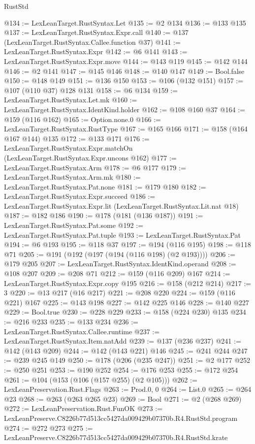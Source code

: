 \begin{lexlean}{RustStd}
\begin{coremodule}
@134 := LexLeanTarget.RustSyntax.Let
@135 := @2 @134
@136 := @133 @135
@137 := LexLeanTarget.RustSyntax.Expr.call
@140 := @137 (LexLeanTarget.RustSyntax.Callee.function @37)
@141 := LexLeanTarget.RustSyntax.Expr
@142 := @6 @141
@143 := LexLeanTarget.RustSyntax.Expr.move
@144 := @143 @119
@145 := @142 @144
@146 := @2 @141
@147 := @145 @146
@148 := @140 @147
@149 := Bool.false
@150 := @148 @149
@151 := @136 @150
@153 := @106 (@132 @151)
@157 := @107 (@110 @37) @128 @131
@158 := @6 @134
@159 := LexLeanTarget.RustSyntax.Let.mk
@160 := LexLeanTarget.RustSyntax.IdentKind.holder
@162 := @108 @160 @37
@164 := @159 (@116 @162)
@165 := Option.none.{0}
@166 := LexLeanTarget.RustSyntax.RustType
@167 := @165 @166
@171 := @158 (@164 @167 @144) @135
@172 := @133 @171
@176 := LexLeanTarget.RustSyntax.Expr.matchOn (LexLeanTarget.RustSyntax.Expr.uncons @162)
@177 := LexLeanTarget.RustSyntax.Arm
@178 := @6 @177
@179 := LexLeanTarget.RustSyntax.Arm.mk
@180 := LexLeanTarget.RustSyntax.Pat.none
@181 := @179 @180
@182 := LexLeanTarget.RustSyntax.Expr.succeed
@186 := LexLeanTarget.RustSyntax.Expr.lit (LexLeanTarget.RustSyntax.Lit.nat @18)
@187 := @182 @186
@190 := @178 (@181 (@136 @187))
@191 := LexLeanTarget.RustSyntax.Pat.some
@192 := LexLeanTarget.RustSyntax.Pat.tuple
@193 := LexLeanTarget.RustSyntax.Pat
@194 := @6 @193
@195 := @118 @37
@197 := @194 (@116 @195)
@198 := @118 @71
@205 := @191 (@192 (@197 (@194 (@116 @198) (@2 @193))))
@206 := @179 @205
@207 := LexLeanTarget.RustSyntax.IdentKind.operand
@208 := @108 @207
@209 := @208 @71
@212 := @159 (@116 @209) @167
@214 := LexLeanTarget.RustSyntax.Expr.copy @195
@216 := @158 (@212 @214)
@217 := 3
@220 := @13 @217 (@16 @217)
@221 := @208 @220
@224 := @159 (@116 @221) @167
@225 := @143 @198
@227 := @142 @225 @146
@228 := @140 @227
@229 := Bool.true
@230 := @228 @229
@233 := @158 (@224 @230) @135
@234 := @216 @233
@235 := @133 @234
@236 := LexLeanTarget.RustSyntax.Callee.runtime
@237 := LexLeanTarget.RustSyntax.Item.natAdd
@239 := @137 (@236 @237)
@241 := @142 (@143 @209)
@244 := @142 (@143 @221) @146
@245 := @241 @244
@247 := @239 @245 @149
@250 := @178 (@206 (@235 @247))
@251 := @2 @177
@252 := @250 @251
@253 := @190 @252
@254 := @176 @253
@255 := @172 @254
@261 := @104 (@153 (@106 (@157 @255) (@2 @105)))
@262 := LexLeanPreservation.Rust.Flags
@263 := Prod.{0, 0}
@264 := List.{0}
@265 := @264 @23
@268 := @263 (@263 @265 @23)
@269 := Bool
@271 := @2 (@268 @269)
@272 := LexLeanPreservation.Rust.FunOK
@273 := LexLeanPreserve.C8226b77d513cc5427da009429b07370b.R4.RustStd.program
@274 := @272 @273
@275 := LexLeanPreserve.C8226b77d513cc5427da009429b07370b.R4.RustStd.krate

\end{coremodule}
\end{lexlean}
